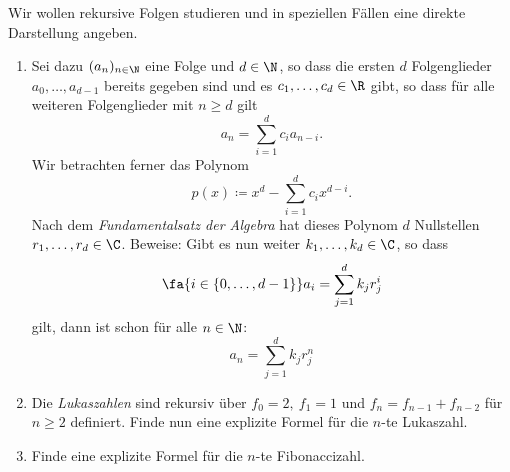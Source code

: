 \begin{prob}
  Wir wollen rekursive Folgen studieren und in speziellen Fällen eine direkte
  Darstellung angeben.
  \begin{enumerate}[label=(\alph*)]
  \item Sei dazu $(a_n)_{n \in \N}$ eine Folge und $d \in \N$, so dass die
    ersten $d$ Folgenglieder $a_0, \dots, a_{d - 1}$ bereits gegeben sind und es
    $c_1, \dots, c_d \in \R$ gibt, so dass für alle weiteren Folgenglieder mit
    $n \geq d$ gilt
    \begin{equation*}
      a_n
      =
      \sum_{i = 1}^d c_i a_{n - i}.
    \end{equation*}
    Wir betrachten ferner das Polynom
    \begin{equation*}
      p(x)
      \coloneqq
      x^d - \sum_{i = 1}^d c_i x^{d - i}.
    \end{equation*}
    Nach dem \emph{Fundamentalsatz der Algebra} hat dieses Polynom $d$
    Nullstellen $r_1, \dots, r_d \in \C$. Beweise: Gibt es nun weiter
    $k_1, \dots, k_d \in \C$, so dass
    \begin{equation*}
      \fa{i \in \{0, \dots, d - 1\}} a_i = \sum_{j = 1}^d k_j r_j^i
    \end{equation*}
    gilt, dann ist schon für alle $n \in \N$:
    \begin{equation*}
      a_n = \sum_{j = 1}^d k_j r_j^n
    \end{equation*}

  \item Die \emph{Lukaszahlen} sind rekursiv über $f_0 = 2, \ f_1 = 1$ und
    $f_n = f_{n - 1} + f_{n - 2}$ für $n \geq 2$ definiert. Finde nun eine
    explizite Formel für die $n$-te Lukaszahl.

  \item Finde eine explizite Formel für die $n$-te Fibonaccizahl.
  \end{enumerate}
\end{prob}
